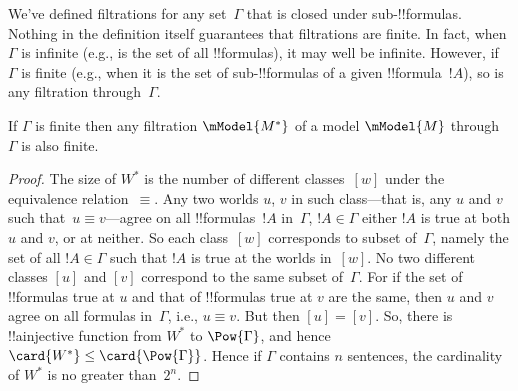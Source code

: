 \documentclass[../../../include/open-logic-section]{subfiles}
\begin{document}

We've defined filtrations for any set~$\Gamma$ that is closed under
sub-!!{formula}s. Nothing in the definition itself guarantees that
filtrations are finite. In fact, when $\Gamma$ is infinite (e.g., is
the set of all !!{formula}s), it may well be infinite. However, if
$\Gamma$ is finite (e.g., when it is the set of sub-!!{formula}s of a
given !!{formula}~$!A$), so is any filtration through~$\Gamma$.

\begin{prop}
  If $\Gamma$ is finite then any filtration $\mModel{M^*}$ of a model
  $\mModel{M}$ through $\Gamma$ is also finite.
\end{prop}

\begin{proof}
  The size of $W^*$ is the number of different classes~$[w]$ under the
  equivalence relation~$\equiv$. Any two worlds $u$, $v$ in such
  class---that is, any $u$ and $v$ such that~$u \equiv v$---agree on
  all !!{formula}s~$!A$ in~$\Gamma$, $!A \in \Gamma$ either $!A$ is
  true at both $u$ and $v$, or at neither. So each class~$[w]$
  corresponds to subset of~$\Gamma$, namely the set of all $!A \in
  \Gamma$ such that $!A$ is true at the worlds in~$[w]$. No two
  different classes $[u]$ and $[v]$ correspond to the same subset
  of~$\Gamma$. For if the set of !!{formula}s true at $u$ and that of
  !!{formula}s true at $v$ are the same, then $u$ and $v$ agree on all
  formulas in~$\Gamma$, i.e., $u \equiv v$. But then $[u] = [v]$.  So,
  there is !!a{injective} function from $W^*$ to $\Pow{\Gamma}$, and
  hence $\card{W^*} \le \card{\Pow{\Gamma}}$.  Hence if $\Gamma$
  contains $n$ sentences, the cardinality of $W^*$ is no greater
  than~$2^n$.
\end{proof}
\end{document}
